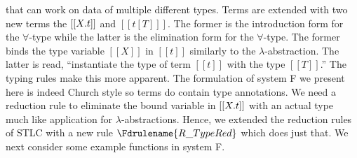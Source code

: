 that can work on data of multiple different types.  Terms are extended
with two new terms the $[[\\X.t]]$ and $[[t [T] ]]$.  The former is
the introduction form for the $\forall$-type while the latter is the
elimination form for the $\forall$-type. The former binds the type
variable $[[X]]$ in $[[t]]$ similarly to the
$\lambda$-abstraction. The latter is read, ``instantiate the type of
term $[[t]]$ with the type $[[T]]$.''  The typing rules make this more
apparent.  The formulation of system F we present here is indeed
Church style so terms do contain type annotations.  We need a
reduction rule to eliminate the bound variable in $[[\\X.t]]$ with an
actual type much like application for $\lambda$-abstractions.  Hence,
we extended the reduction rules of STLC with a new rule
$\Fdrulename{R\_TypeRed}$ which does just that.  We next consider some
example functions in system F.

